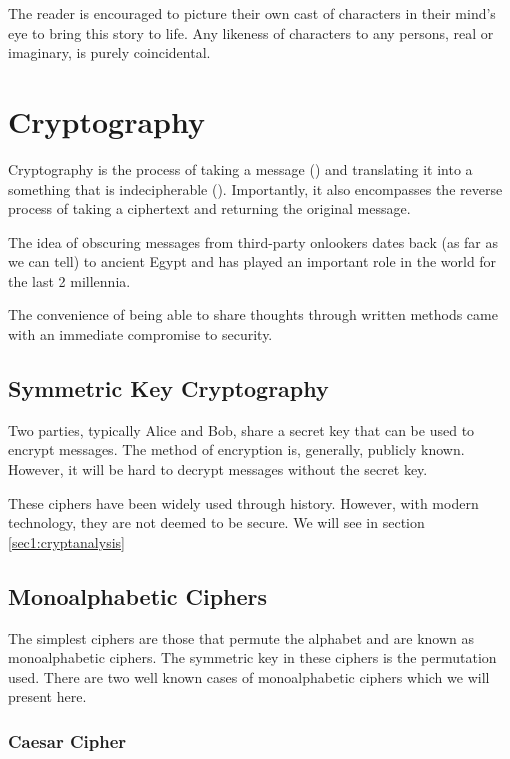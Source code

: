 The reader is encouraged to picture their own cast of characters in their mind's eye to bring this story to life. Any likeness of characters to any persons, real or imaginary, is purely coincidental.

\section{Cryptography}
\label{sec1:crypto}

Cryptography is the process of taking a message () and translating it into a something that is indecipherable (). Importantly, it also encompasses the reverse process of taking a ciphertext and returning the original message. 

The idea of obscuring messages from third-party onlookers dates back (as far as we can tell) to ancient Egypt and has played an important role in the world for the last 2 millennia. 

The convenience of being able to share thoughts through written methods came with an immediate compromise to security.

\subsection{Symmetric Key Cryptography}

Two parties, typically Alice and Bob, share a secret key that can be used to encrypt messages. The method of encryption is, generally, publicly known. However, it will be hard to decrypt messages without the secret key.

These ciphers have been widely used through history. However, with modern technology, they are not deemed to be secure. We will see in section \ref{sec1:cryptanalysis}

\subsection{Monoalphabetic Ciphers}

The simplest ciphers are those that permute the alphabet and are known as {\color{bristol-red} monoalphabetic ciphers}. The symmetric key in these 	ciphers is the permutation used. There are two well known cases of monoalphabetic ciphers which we will present here. 

\subsubsection*{Caesar Cipher}

